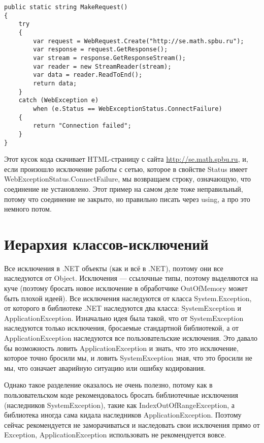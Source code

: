 \documentclass[a5paper]{article}
\begin{document}
\begin{verbatim}
public static string MakeRequest()
{
    try
    {
        var request = WebRequest.Create("http://se.math.spbu.ru");
        var response = request.GetResponse();
        var stream = response.GetResponseStream();
        var reader = new StreamReader(stream);
        var data = reader.ReadToEnd();
        return data;
    }
    catch (WebException e) 
        when (e.Status == WebExceptionStatus.ConnectFailure)
    {
        return "Connection failed";
    }
}
\end{verbatim}

Этот кусок кода скачивает HTML-страницу с сайта \url{http://se.math.spbu.ru}, и, если произошло исключение работы с сетью, которое в свойстве Status имеет WebExceptionStatus.ConnectFailure, мы возвращаем строку, означающую, что соединение не установлено. Этот пример на самом деле тоже неправильный, потому что соединение не закрыто, но правильно писать через using, а про это немного потом.

\section{Иерархия классов-исключений}

Все исключения в .NET объекты (как и всё в .NET), поэтому они все наследуются от Object. Исключения --- ссылочные типы, поэтому выделяются на куче (поэтому бросать новое исключение в обработчике OutOfMemory может быть плохой идеей). Все исключения наследуются от класса System.Exception, от которого в библиотеке .NET наследуются два класса: SystemException и ApplicationException. Изначально идея была такой, что от SystemException наследуются только исключения, бросаемые стандартной библиотекой, а от ApplicationException наследуются все пользовательские исключения. Это давало бы возможность ловить ApplicationException и знать, что это исключение, которое точно бросили мы, и ловить SystemException зная, что это бросили не мы, что означает аварийную ситуацию или ошибку кодирования.

Однако такое разделение оказалось не очень полезно, потому как в пользовательском коде рекомендовалось бросать библиотечные исключения (наследников SystemException), такие как IndexOutOfRangeException, а библиотека иногда сама кидала наследников ApplicationException. Поэтому сейчас рекомендуется не заморачиваться и наследовать свои исключения прямо от Exception, ApplicationException использовать не рекомендуется вовсе.
\end{document}
